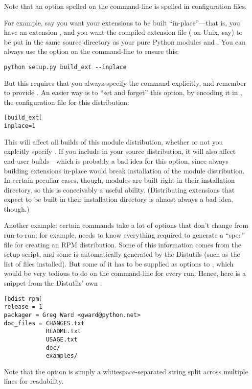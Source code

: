 \documentclass{howto}
\begin{document}
Note that an option spelled  on the command-line 
is spelled  in configuration files.

For example, say you want your extensions to be built
``in-place''---that is, you have an extension , and you
want the compiled extension file ( on Unix, say) to be put
in the same source directory as your pure Python modules
 and .  You can always use the
 option on the command-line to ensure this:
\begin{verbatim}
python setup.py build_ext --inplace
\end{verbatim}
But this requires that you always specify the 
command explicitly, and remember to provide .
An easier way is to ``set and forget'' this option, by encoding it in
, the configuration file for this distribution:
\begin{verbatim}
[build_ext]
inplace=1
\end{verbatim}
This will affect all builds of this module distribution, whether or not
you explcitly specify .  If you include
 in your source distribution, it will also affect
end-user builds---which is probably a bad idea for this option, since
always building extensions in-place would break installation of the
module distribution.  In certain peculiar cases, though, modules are
built right in their installation directory, so this is conceivably a
useful ability.  (Distributing extensions that expect to be built in
their installation directory is almost always a bad idea, though.)

Another example: certain commands take a lot of options that don't
change from run-to-run; for example,  needs to know
everything required to generate a ``spec'' file for creating an RPM
distribution.  Some of this information comes from the setup script, and
some is automatically generated by the Distutils (such as the list of
files installed).  But some of it has to be supplied as options to
, which would be very tedious to do on the
command-line for every run.  Hence, here is a snippet from the
Distutils' own :
\begin{verbatim}
[bdist_rpm]
release = 1
packager = Greg Ward <gward@python.net>
doc_files = CHANGES.txt
            README.txt
            USAGE.txt
            doc/
            examples/
\end{verbatim}
Note that the  option is simply a
whitespace-separated string split across multiple lines for readability.
\end{document}
